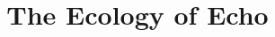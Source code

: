\newif\iflatextwoe
\newif\ifepsf
\newif\ifpsfiginstalled

%
%
%
%
%
%
\latextwoefalse
\epsffalse
\psfiginstalledtrue
%
%
%
%
%


%
%

%
%
%
%
%
%


\ifepsf
\documentstyle[12pt,epsfig]{article}
\else
\ifpsfiginstalled
{}
\else
\documentstyle[12pt]{article}
%

\fi
\fi

\iflatextwoe\else
\newcommand{\emph}{\em}
\fi

\oddsidemargin=0.0751in
\evensidemargin=0.075in
\textwidth=6.5in


\title{\bf The Ecology of Echo}

\vspace{0.25in}

